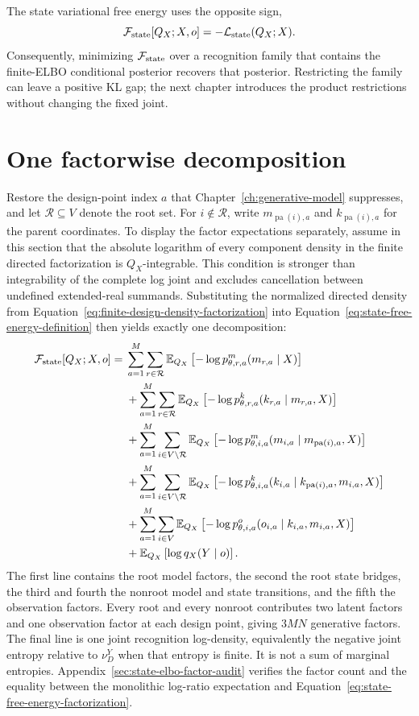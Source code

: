 The state variational free energy uses the opposite sign,
\begin{equation}
\mathcal F_{\mathrm{state}}[Q_X;X,o]
=-\mathcal L_{\mathrm{state}}(Q_X;X).
\label{eq:state-free-energy-definition}
\end{equation}
Consequently, minimizing \(\mathcal F_{\mathrm{state}}\) over a recognition family that contains the finite-ELBO conditional posterior recovers that posterior. Restricting the family can leave a positive KL gap; the next chapter introduces the product restrictions without changing the fixed joint.

\section{One factorwise decomposition}

Restore the design-point index \(a\) that Chapter~\ref{ch:generative-model} suppresses, and let \(\mathcal R\subseteq V\) denote the root set. For \(i\notin\mathcal R\), write \(m_{\operatorname{pa}(i),a}\) and \(k_{\operatorname{pa}(i),a}\) for the parent coordinates. To display the factor expectations separately, assume in this section that the absolute logarithm of every component density in the finite directed factorization is \(Q_X\)-integrable. This condition is stronger than integrability of the complete log joint and excludes cancellation between undefined extended-real summands. Substituting the normalized directed density from Equation~\eqref{eq:finite-design-density-factorization} into Equation~\eqref{eq:state-free-energy-definition} then yields exactly one decomposition:
\begin{align}
\mathcal F_{\mathrm{state}}[Q_X;X,o]
={}&
\sum_{a=1}^{M}\sum_{r\in\mathcal R}
\mathbb E_{Q_X}\left[
-\log p_{\theta,r,a}^{m}(m_{r,a}\mid X)
\right]
\label{eq:state-free-energy-factorization}\\
&+\sum_{a=1}^{M}\sum_{r\in\mathcal R}
\mathbb E_{Q_X}\left[
-\log p_{\theta,r,a}^{k}(k_{r,a}\mid m_{r,a},X)
\right]\notag\\
&+\sum_{a=1}^{M}\sum_{i\in V\setminus\mathcal R}
\mathbb E_{Q_X}\left[
-\log p_{\theta,i,a}^{m}
(m_{i,a}\mid m_{\operatorname{pa}(i),a},X)
\right]\notag\\
&+\sum_{a=1}^{M}\sum_{i\in V\setminus\mathcal R}
\mathbb E_{Q_X}\left[
-\log p_{\theta,i,a}^{k}
(k_{i,a}\mid k_{\operatorname{pa}(i),a},m_{i,a},X)
\right]\notag\\
&+\sum_{a=1}^{M}\sum_{i\in V}
\mathbb E_{Q_X}\left[
-\log p_{\theta,i,a}^{o}(o_{i,a}\mid k_{i,a},m_{i,a},X)
\right]\notag\\
&+\mathbb E_{Q_X}\left[\log q_X(Y\mid o)\right].\notag
\end{align}
The first line contains the root model factors, the second the root state bridges, the third and fourth the nonroot model and state transitions, and the fifth the observation factors. Every root and every nonroot contributes two latent factors and one observation factor at each design point, giving \(3MN\) generative factors. The final line is one joint recognition log-density, equivalently the negative joint entropy relative to \(\nu_D^Y\) when that entropy is finite. It is not a sum of marginal entropies. Appendix~\ref{sec:state-elbo-factor-audit} verifies the factor count and the equality between the monolithic log-ratio expectation and Equation~\eqref{eq:state-free-energy-factorization}.

